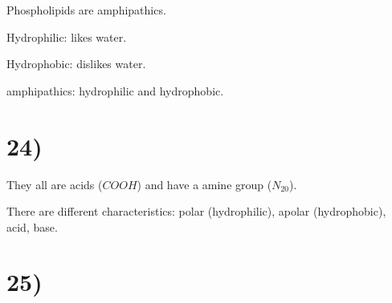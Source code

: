 Phospholipids are amphipathics.

Hydrophilic: likes water.

Hydrophobic: dislikes water.

amphipathics: hydrophilic and hydrophobic.

\section*{24)}

They all are acids ($COOH$) and have a amine group ($N_20$). 

There are different characteristics: polar (hydrophilic), apolar (hydrophobic), acid, base.

\section*{25)}





\nocite{*}







